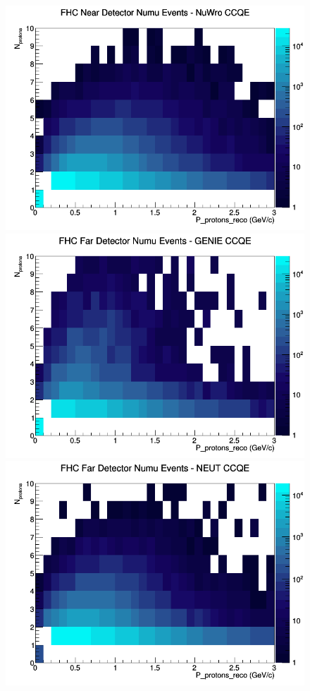\begin{figure}[h]
\includegraphics[width=\linewidth]{eff_N_P/LAr/protons/CCQE_FHC_ND_numu_N_P_NuWro.png}
\endminipage
\newline
{}
\includegraphics[width=\linewidth]{eff_N_P/LAr/protons/CCQE_FHC_FD_numu_N_P_GENIE.png}
\endminipage
{}
\includegraphics[width=\linewidth]{eff_N_P/LAr/protons/CCQE_FHC_FD_numu_N_P_NEUT.png}

\end{figure}

